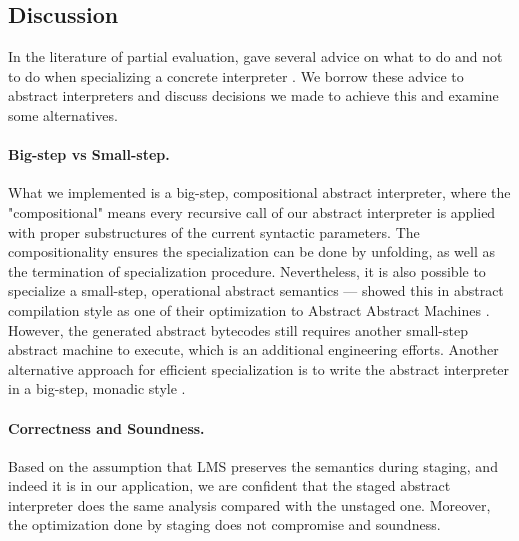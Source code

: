 \subsection{Discussion}
In the literature of partial evaluation, \citeauthor{10.1007/3-540-61580-6_11} gave several
advice on what to do and not to do when specializing a concrete interpreter \cite{10.1007/3-540-61580-6_11}. 
We borrow these advice to abstract interpreters and discuss decisions we made to achieve this 
and examine some alternatives.

\paragraph{Big-step vs Small-step.}
What we implemented is a big-step, compositional  abstract interpreter, 
where the "compositional" means every recursive call of our abstract interpreter is applied with proper 
substructures of the current syntactic parameters. 
The compositionality ensures the specialization can be done by unfolding, as well as the termination of specialization procedure.
Nevertheless, it is also possible to specialize a small-step, operational abstract semantics --- \citeauthor{Johnson:2013:OAA:2500365.2500604}
showed this in abstract compilation \cite{Boucher:1996:ACN:647473.727587} style as one of their optimization 
to Abstract Abstract Machines \cite{Johnson:2013:OAA:2500365.2500604}. 
However, the generated abstract bytecodes still requires another small-step abstract machine 
to execute, which is an additional engineering efforts.
Another alternative approach for efficient specialization is to write the abstract interpreter 
in a big-step, monadic style \cite{DBLP:journals/pacmpl/DaraisLNH17}.


\paragraph{Correctness and Soundness.}
Based on the assumption that LMS preserves the semantics during staging, and indeed it is 
in our application, 
we are confident that the staged abstract interpreter does the same analysis compared 
with the unstaged one. Moreover, the optimization done by staging does not compromise
and soundness.


